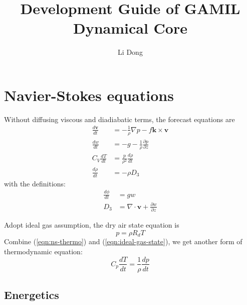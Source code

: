 \documentclass[12pt]{article}
\title{Development Guide of GAMIL Dynamical Core}
\author{Li Dong}
\numberwithin{equation}{section}
\renewcommand{\d}[2]{\frac{d #1}{d #2}}
\newcommand{\dt}[1]{\d{#1}{t}}
\newcommand{\pd}[2]{\frac{\partial #1}{\partial #2}}
\renewcommand{\vec}[1]{\mathbf{#1}}
\begin{document}
\maketitle

\section{Navier-Stokes equations}

Without diffusing viscous and diadiabatic terms, the forecast equations are
\begin{align}
  \dt{\vec{v}} & = - \frac{1}{\rho} \nabla{p} - f \vec{k} \times \vec{v} \label{eqn:ns-horz-momentum} \\
  \dt{w} & = - g - \frac{1}{\rho} \pd{p}{z} \label{eqn:ns-vert-momentum} \\
  C_V \dt{T} & = \frac{p}{\rho^2} \dt{\rho} \label{eqn:ns-thermo} \\
  \dt{\rho} & = - \rho D_3 \label{eqn:ns-mass}
\end{align}
with the definitions:
\begin{align}
  \dt{\phi} & = g w \label{eqn:geopotential} \\
  D_3 & = \nabla \cdot \vec{v} + \pd{w}{z} \label{eqn:ns-divergence}
\end{align}

Adopt ideal gas assumption, the dry air state equation is
\begin{equation}
  p = \rho R_d T \label{eqn:ideal-gas-state}
\end{equation}
Combine (\ref{eqn:ns-thermo}) and (\ref{eqn:ideal-gas-state}), we get another form of thermodynamic equation:
\begin{equation}
  C_p \dt{T} = \frac{1}{\rho} \dt{p}
\end{equation}

\subsection{Energetics}
\end{document}
